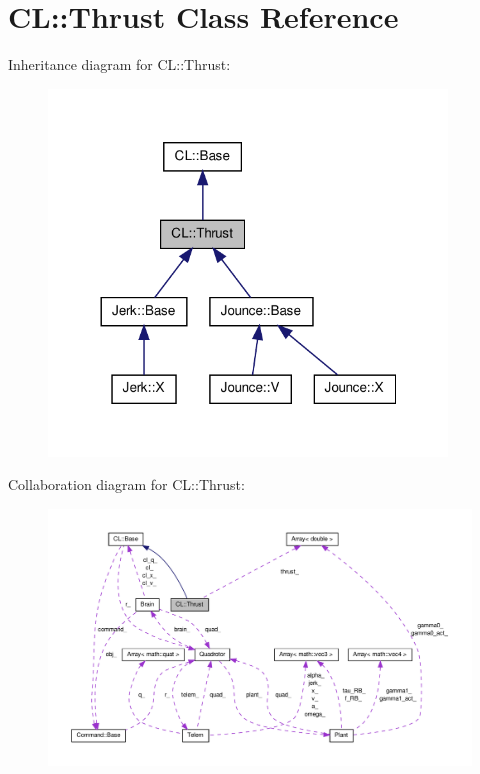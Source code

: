\hypertarget{classCL_1_1Thrust}{\section{\-C\-L\-:\-:\-Thrust \-Class \-Reference}
\label{classCL_1_1Thrust}
}


\-Inheritance diagram for \-C\-L\-:\-:\-Thrust\-:\nopagebreak
\begin{figure}[H]
\begin{center}
\leavevmode
\includegraphics[width=300pt]{classCL_1_1Thrust__inherit__graph}
\end{center}
\end{figure}


\-Collaboration diagram for \-C\-L\-:\-:\-Thrust\-:\nopagebreak
\begin{figure}[H]
\begin{center}
\leavevmode
\includegraphics[width=350pt]{classCL_1_1Thrust__coll__graph}
\end{center}
\end{figure}
